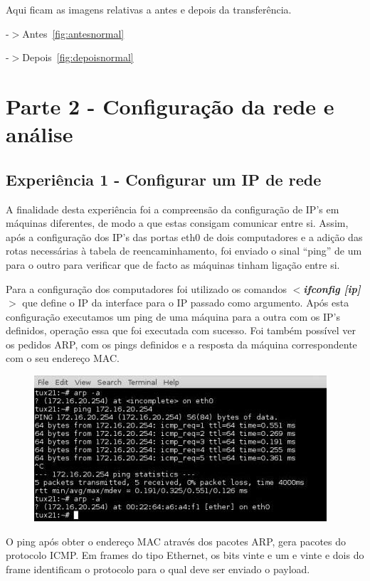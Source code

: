 \documentclass[a4paper]{article}
\begin{document}
Aqui ficam as imagens relativas a antes e depois da transferência.

-$>$Antes~\autoref{fig:antesnormal}

-$>$Depois~\autoref{fig:depoisnormal}


\section{Parte 2 - Configuração da rede e análise}
\subsection{Experiência 1 - Configurar um IP de rede}
A finalidade desta experiência foi a compreensão da configuração de IP’s em máquinas diferentes, de modo a que estas consigam comunicar entre si. Assim, após a configuração dos IP’s das portas eth0 de dois computadores e a adição das rotas necessárias à tabela de reencaminhamento, foi enviado o sinal “ping” de um para o outro para verificar que de facto as máquinas tinham ligação entre si.

Para a configuração dos computadores foi utilizado os comandos \textbf{\textit{$<$ifconfig [ip]$>$}} que define o IP da interface para o IP passado como argumento. Após esta configuração executamos um ping de uma máquina para a outra com os IP’s definidos, operação essa que foi executada com sucesso. Foi também possível ver os pedidos ARP, com os pings definidos e a resposta da máquina correspondente com o seu endereço MAC.

\begin{figure}[h!]
\centering
\includegraphics[scale=0.5]{res/image1.jpg}
\end{figure}

O ping após obter o endereço MAC através dos pacotes ARP, gera pacotes do protocolo ICMP. Em frames do tipo Ethernet, os bits vinte e um e vinte e dois do frame identificam o protocolo para o qual deve ser enviado o payload.
\end{document}
